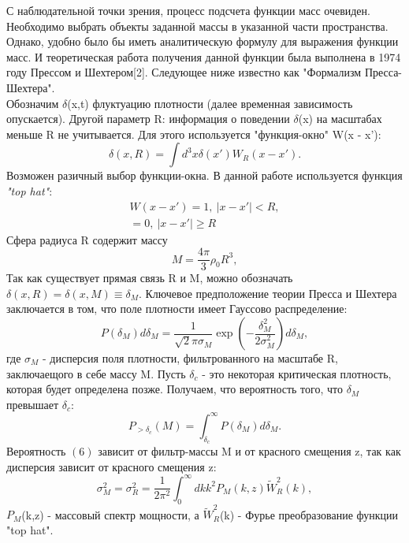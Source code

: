 \documentclass[11pt]{article}
\begin{document}
 С наблюдательной точки зрения, процесс подсчета функции масс очевиден. Необходимо выбрать объекты заданной массы в указанной части пространства. Однако, удобно было бы иметь аналитическую формулу для выражения функции масс. И теоретическая работа получения данной функции была выполнена в 1974 году Прессом и Шехтером[2]. Следующее ниже известно как "Формализм Пресса-Шехтера". \\

Обозначим $\delta$(x,t) флуктуацию плотности (далее временная зависимость опускается).  Другой параметр R: информация о поведении $\delta$(x) на масштабах меньше R не учитывается. Для этого используется "функция-окно"  W(x - x'):
\begin{equation}
	\delta(x,R) = \int d^3x \delta(x')W_{R}(x-x').
\end{equation}
Возможен разичный выбор функции-окна. В данной работе используется функция \textit{"top hat"}:
\begin{equation}
	\begin{split}
	W (x - x') = 1,\ |x-x'|<R,\\ = 0,\ |x-x'| \geq  R
	\end{split}
\end{equation}  
Сфера радиуса R содержит массу
\begin{equation}
M = \frac{4\pi}{3}\rho_0 R^3,
\end{equation}
Так как существует прямая связь R и M, можно обозначать $\delta(x,R)=\delta(x,M) \equiv \delta_M.$
Ключевое предположение теории Пресса и Шехтера заключается в том, что поле плотности имеет Гауссово распределение: 
\begin{equation}
P(\delta_M)d \delta_M = \frac{1}{ \sqrt{2} \pi \sigma _M} \exp(-\frac{\delta_{M}^{2}}{2\sigma_{M}^{2}})d \delta_M, 
\end{equation}
где $\sigma_M$ - дисперсия поля плотности, фильтрованного на масштабе R, заключаещого в себе массу M. Пусть $\delta_c$ - это некоторая критическая плотность, которая будет определена позже. Получаем, что вероятность того, что $\delta_M$ превышает $\delta_c$:
\begin{equation}
P_{> \delta_c} (M) = \int_{\delta_c}^{\infty} P(\delta_M)d \delta_M.
\end{equation}
Вероятность $(6)$ зависит от фильтр-массы M и от красного смещения z, так как дисперсия зависит от красного смещения z:
\begin{equation}
\sigma_{M}^{2} = \sigma_{R}^{2} = \frac{1}{2\pi^2} \int_{0}^{\infty} dkk^2P_M(k,z)\tilde{W}_{R}^{2}(k),
\end{equation}
$P_M$(k,z) - массовый спектр мощности, а $\tilde{W}_{R}^{2}$(k) - Фурье преобразование функции "top hat".
\end{document}
